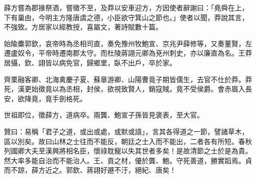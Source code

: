 \begin{pinyinscope}
薛方嘗為郡掾祭酒，嘗徵不至，及莽以安車迎方，方因使者辭謝曰：「堯舜在上，下有巢由，今明主方隆唐虞之德，小臣欲守箕山之節也。」使者以聞，莽說其言，不強致。方居家以經教授，喜屬文，著詩賦數十篇。

始隃麋郭欽，哀帝時為丞相司直，奏免豫州牧鮑宣、京兆尹薛修等，又奏董賢，左遷盧奴令，平帝時遷南郡太守。而杜陵蔣詡元卿為兗州刺史，亦以廉直為名。王莽居攝，欽、詡皆以病免官，歸鄉里，臥不出戶，卒於家。

齊栗融客卿、北海禽慶子夏、蘇章游卿、山陽曹竟子期皆儒生，去官不仕於莽。莽死，漢更始徵竟以為丞相，封侯，欲視致賢人，銷寇賊。竟不受侯爵。會赤眉入長安，欲降竟，竟手劍格死。

世祖即位，徵薛方，道病卒。兩龔、鮑宣子孫皆見褒表，至大官。

贊曰：易稱「君子之道，或出或處，或默或語」，言其各得道之一節，譬諸草木，區以別矣。故曰山林之士往而不能反，朝廷之士入而不能出，二者各有所短。春秋列國卿大夫至漢興將相名臣，懷祿耽寵以失其世者多矣！是故清節之士於是為貴。然大率多能自治而不能治人。王、貢之材，優於龔、鮑。守死善道，勝實蹈焉。貞而不諒，薛方近之。郭欽、蔣詡好遯不汙，絕紀、唐矣！


\end{pinyinscope}
